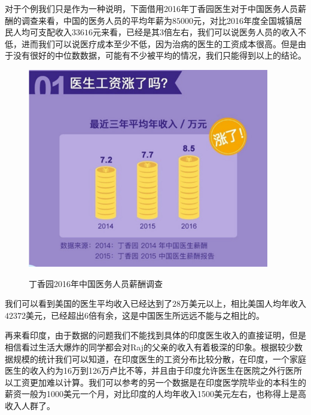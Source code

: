 \documentclass[11pt,twoside,a4paper]{article}
\begin{document}
		对于个例我们只是作为一种说明，下面借用2016年丁香园医生对于中国医务人员薪酬的调查\cite{ref1}来看，中国的医务人员的平均年薪为$85000$元，对比2016年度全国城镇居民人均可支配收入$33616$元\cite{ref2}来看，已经是其3倍左右，我们可以说医务人员的收入不低，进而我们可以说医疗成本至少不低，因为治病的医生的工资成本很高。但是由于没有很好的中位数数据，可能有不少被平均的情况，我们只能得到以上的结论。
		\begin{figure}[htb]
			\centering
			\includegraphics{graph/DingXiangyuan.png}\\
			\caption{丁香园2016年中国医务人员薪酬调查}
		\end{figure}
	
		我们可以看到美国的医生平均收入已经达到了$28$万美元以上\cite{ref3}，相比美国人均年收入$42372$美元，已经超出6倍有余，这是中国医生所远远不能与之相比的。
		
		
		再来看印度，由于数据的问题我们不能找到具体的印度医生收入的直接证明，但是相信看过生活大爆炸的同学都会对Raj的父亲的收入有着极深的印象。根据较少数据规模的统计我们可以知道，在印度医生的工资分布比较分散，在印度，一个家庭医生的收入约为16万到126万卢比不等，并且由于印度允许医生在医院之外行医所以工资更加难以计算。我们可以参考的另一个数据是在印度医学院毕业的本科生的薪资一般为1000美元一个月，对比印度的人均年收入1500美元左右，也称得上是高收入人群了。
		
\end{document}
